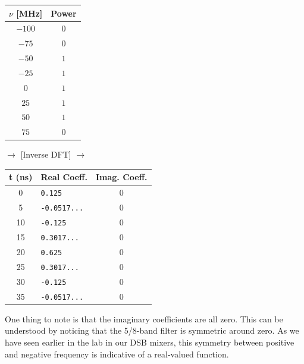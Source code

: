 \documentclass[12pt]{article}
\begin{document}
\begin{table}
\begin{center}
  \begin{tabular}{ c | c }
    $\nu$ [MHz] & Power \\ \hline
    $-100$ & $0 $\\
    $-75$ & $0 $\\
    $-50$ & $1 $\\
    $-25$ & $1 $ \\
    $0$ & $1 $\\
    $25$ & $1 $  \\
    $50$ & $1$ \\
    $75$ & $0 $ \\
  \end{tabular}
  $\rightarrow$ [Inverse DFT] $\rightarrow$
  \begin{tabular}{c | l | c }
    t (ns)& Real Coeff. & Imag. Coeff.\\ \hline
    0 & \texttt{0.125} & $0$ \\
    5 & \texttt{-0.0517...}  & $0$ \\
    10 & \texttt{-0.125} & $0$ \\
    15 & \texttt{0.3017...} & $0$ \\
    20 & \texttt{0.625} & $0$ \\
    25 & \texttt{0.3017...} & $0$ \\
    30 & \texttt{-0.125} & $0$ \\
    35 & \texttt{-0.0517...} & $0$ \\
  \end{tabular}
\end{center}
\end{table}


One thing to note is that the imaginary coefficients are all zero. This can be understood by noticing that the 5/8-band filter is symmetric around zero. As we have seen earlier in the lab in our DSB mixers, this symmetry between positive and negative frequency is indicative of a real-valued function.
\end{document}
